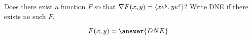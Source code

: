 \documentclass{ximera}
\author{David Guichard \and Neal Koblitz \and H. Jerome Keisler \and Albert Scheller \and Barry Balof \and Mike Wills \and Matthew Carr}
\begin{document}
\begin{exercise}




Does there exist a function $F$ so that $\nabla F(x,y)=\left\langle xe^{y},ye^{x}\right\rangle$? Write DNE if there exists no such $F$. 

\begin{prompt}
\[
F(x,y)=\answer{DNE}
\]
\end{prompt}
\end{exercise}
\end{document}
